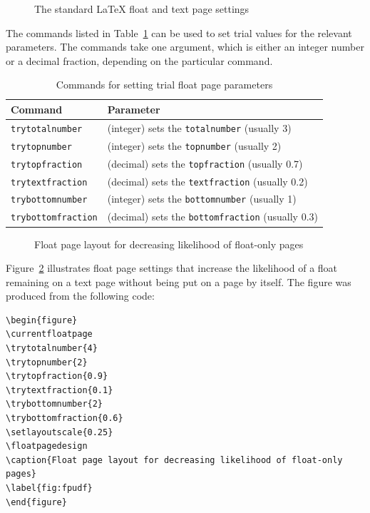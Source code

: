 \documentclass[11pt]{article}
\makeatletter
\newcommand{\tref}[1]{Table~\ref{#1}}
\newcommand{\pixcom}[1]{\texttt{\bs #1}\index{#1/ @\texttt{\protect\bs #1}}}
\makeatother
\begin{document}
\begin{figure}
\currentfloatpage
{}
\floatpagedesign
\caption{The standard \LaTeX{} float and text page settings}
\label{fig:fpstd}
\end{figure}

    The commands listed in \tref{tab:tfloatp} can be used to set trial values
for the relevant parameters. The commands take one argument, which is either
an integer number or a decimal fraction, depending on the particular command.

\begin{table}
\centering
\caption{Commands for setting trial float page parameters}\label{tab:tfloatp}
\begin{tabular}{|l|l|} \hline
Command & Parameter \\ \hline
\pixcom{trytotalnumber} & (integer) sets the \pixcom{totalnumber} (usually 3) \\
\pixcom{trytopnumber} & (integer) sets the \pixcom{topnumber} (usually 2) \\
\pixcom{trytopfraction} & (decimal) sets the \pixcom{topfraction} (usually 0.7) \\
\pixcom{trytextfraction} & (decimal) sets the \pixcom{textfraction} (usually 0.2) \\
\pixcom{trybottomnumber} & (integer) sets the \pixcom{bottomnumber} (usually 1) \\
\pixcom{trybottomfraction} & (decimal) sets the \pixcom{bottomfraction} (usually 0.3) \\
\hline
\end{tabular}
\end{table}

\begin{figure}
\currentfloatpage
{}
\floatpagedesign
\caption{Float page layout for decreasing likelihood of float-only pages}
\label{fig:fpudf}
\end{figure}

    Figure~\ref{fig:fpudf} illustrates float page settings that increase
the likelihood of a float remaining on a text page without being put on
a page by itself. The figure was produced from the following code:
\begin{verbatim}
\begin{figure}
\currentfloatpage
\trytotalnumber{4}
\trytopnumber{2}
\trytopfraction{0.9}
\trytextfraction{0.1}
\trybottomnumber{2}
\trybottomfraction{0.6}
\setlayoutscale{0.25}
\floatpagedesign
\caption{Float page layout for decreasing likelihood of float-only pages}
\label{fig:fpudf}
\end{figure}
\end{verbatim}
\end{document}
